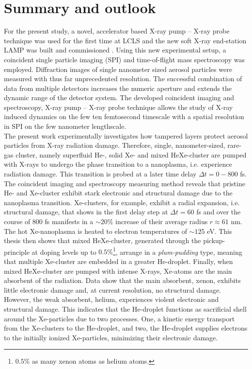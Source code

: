 \chapter{Summary and outlook}\label{ch:summary_outlook}
For the present study, a novel, accelerator based X-ray pump -- X-ray probe technique was used for the first time at LCLS \citep{Lutman-2013-PRL} and the new soft X-ray end-station LAMP was built and commissioned \citep{Ferguson-2015-JSR}. Using this new experimental setup, a coincident single particle imaging (SPI) and time-of-flight mass spectroscopy was employed. Diffraction images of single nanometer sized aerosol particles were measured with thus far unprecedented resolution. The successful combination of data from multiple detectors increases the numeric aperture and extends the dynamic range of the detector system. The developed coincident imaging and spectroscopy, X-ray pump -- X-ray probe technique allows the study of X-ray induced dynamics on the few ten femtosecond timescale with a spatial resolution in SPI on the few nanometer lengthscale.\\
%
The present work experimentally investigates how tampered layers protect aerosol particles from X-ray radiation damage. Therefore, single, nanometer-sized, rare-gas cluster, namely superfluid He-, solid Xe- and mixed HeXe-cluster are pumped with X-rays to undergo the phase transition to a nanoplasma, i.e. experience radiation damage. This transition is probed at a later time delay $\Delta t=0 - 800$ fs. The coincident imaging and spectroscopy measuring method reveals that pristine He- and Xe-cluster exhibit stark electronic and structural damage due to the nanoplasma transition. Xe-clusters, for example, exhibit a radial expansion, i.e. structural damage, that shows in the first delay step at $\Delta t = 60$ fs and over the course of 800 fs manifests in a $\sim 20 \%$ increase of their average radius $r\approx 61$ nm. The hot Xe-nanoplasma is heated to electron temperatures of $\sim 125$ eV. This thesis then shows that mixed HeXe-cluster, generated through the pickup-principle at doping levels up to $0.5\%$\footnote{$0.5\%$ as many xenon atoms as helium atoms.}, arrange in a \textit{plum-pudding} type, meaning that multiple Xe-cluster are embedded in a greater He-droplet. Finally, when mixed HeXe-cluster are pumped with intense X-rays, Xe-atoms are the main absorbent of the radiation. Data show that the main absorbent, xenon, exhibits little electronic damage and, at current resolution, no structural damage. However, the weak absorbent, helium, experiences violent electronic and structural damage. This indicates that the He-droplet functions as sacrificial shell around the Xe-particles due to two processes. One, a kinetic energy transport from the Xe-clusters to the He-droplet, and two, the He-droplet supplies electrons to the initially ionized Xe-particles, minimizing their electronic damage.\\
